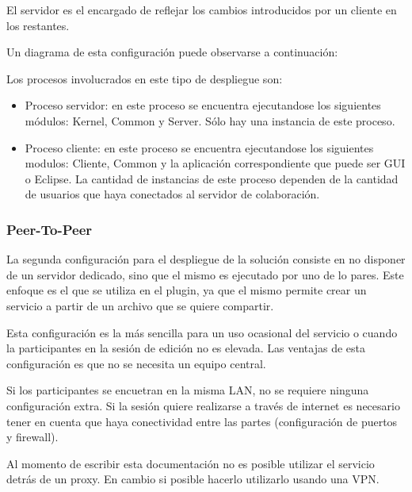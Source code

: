 \documentclass[12pt,a4paper]{article}
\begin{document}
El servidor es el encargado de reflejar los cambios introducidos por un cliente en los restantes.

Un diagrama de esta configuración puede observarse a continuación:


Los procesos involucrados en este tipo de despliegue son:

\begin{itemize}
	\item Proceso servidor: en este proceso se encuentra ejecutandose los siguientes módulos: Kernel, Common y Server. Sólo
	hay una instancia de este proceso.
	\item Proceso cliente: en este proceso se encuentra ejecutandose los siguientes modulos: Cliente, Common y la aplicación
	correspondiente que puede ser GUI o Eclipse. La cantidad de instancias de este proceso dependen de la cantidad de usuarios que
	haya conectados al servidor de colaboración.
\end{itemize}

\subsubsection{Peer-To-Peer}
La segunda configuración para el despliegue de la solución consiste en no disponer de un servidor dedicado, sino que el
mismo es ejecutado por uno de lo pares. Este enfoque es el que se utiliza en el plugin, ya que el mismo permite crear un servicio
a partir de un archivo que se quiere compartir.


Esta configuración es la más sencilla para un uso ocasional del servicio o cuando la participantes en la sesión de edición no
es elevada. Las ventajas de esta configuración es que no se necesita un equipo central.

Si los participantes se encuetran en la misma LAN, no se requiere ninguna configuración extra. Si la sesión quiere realizarse
a través de internet es necesario tener en cuenta que haya conectividad entre las partes (configuración de puertos y firewall).

Al momento de escribir esta documentación no es posible utilizar el servicio detrás de un proxy. En cambio si posible 
hacerlo utilizarlo usando una VPN.
\end{document}
